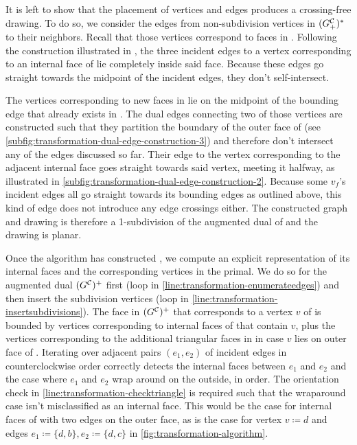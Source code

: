 It is left to show that the placement of vertices and edges produces a crossing-free drawing.
To do so, we consider the edges from non-subdivision vertices in $(G^\mathcal{C}_{+})^*$ to their neighbors.
Recall that those vertices correspond to faces in \clustergraph{+}.
Following the construction illustrated in , the three incident edges to a vertex corresponding to an internal face of \clustergraph{} lie completely inside said face.
Because these edges go straight towards the midpoint of the incident edges, they don't self-intersect.

The vertices corresponding to new faces in \clustergraph{+} lie on the midpoint of the bounding edge that already exists in \clustergraph{}.
The dual edges connecting two of those vertices are constructed such that they partition the boundary of the outer face of \clustergraph{} (see \cref{subfig:transformation-dual-edge-construction-3}) and therefore don't intersect any of the edges discussed so far.
Their edge to the vertex corresponding to the adjacent internal face goes straight towards said vertex, meeting it halfway, as illustrated in \cref{subfig:transformation-dual-edge-construction-2}.
Because some $v_f$'s incident edges all go straight towards its bounding edges as outlined above, this kind of edge does not introduce any edge crossings either.
The constructed graph and drawing is therefore a 1-subdivision of the augmented dual of \clustergraph{} and the drawing is planar.

Once the algorithm has constructed \initmap{}, we compute an explicit representation of its internal faces and the corresponding vertices in the primal.
We do so for the augmented dual $(G^\mathcal{C}_{})^+$ first (loop in \cref{line:transformation-enumerateedges}) and then insert the subdivision vertices (loop in \cref{line:transformation-insertsubdivisions}).
The face in $(G^\mathcal{C}_{})^+$ that corresponds to a vertex $v$ of \clustergraph{} is bounded by vertices corresponding to internal faces of \clustergraph{} that contain $v$, plus the vertices corresponding to the additional triangular faces in \clustergraph{+} in case $v$ lies on outer face of \clustergraph{}.
Iterating over adjacent pairs $(e_1, e_2)$ of incident edges in counterclockwise order correctly detects the internal faces between $e_1$ and $e_2$ and the case where $e_1$ and $e_2$ wrap around on the outside, in order.
The orientation check in \cref{line:transformation-checktriangle} is required such that the wraparound case isn't misclassified as an internal face.
This would be the case for internal faces of \clustergraph{} with two edges on the outer face, as is the case for vertex $v \coloneqq d$ and edges $e_1 \coloneqq \{d,b\}, e_2 \coloneqq \{d,c\}$ in \cref{fig:transformation-algorithm}.



